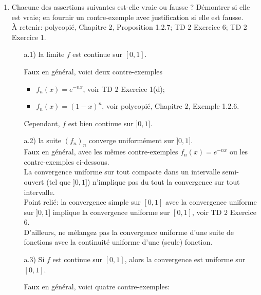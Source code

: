 \documentclass[a4paper,10pt]{article}
\newcommand{\correction}[1]{{\color{red}#1}}
\newcommand{\comment}[1]{{\color{blue}#1}}
\begin{document}
\begin{enumerate}[label=\alph*)]
    \item Chacune des assertions suivantes est-elle vraie ou fausse ? Démontrer si elle est vraie; en fournir un contre-exemple avec justification si elle est fausse.\\
    \comment{À retenir: polycopié, Chapitre 2, Proposition 1.2.7; TD 2 Exercice 6; TD 2 Exercice 1.}
    \begin{itemize}
        \item[a.1)] la limite $f$ est continue sur $[0,1]$.\\
        \correction{Faux en général, voici deux contre-exemples
        \begin{itemize}
            \item $f_n(x)=e^{-nx}$, voir TD 2 Exercice 1(d);
            \item $f_n(x)=(1-x)^n$, voir polycopié, Chapitre 2, Exemple 1.2.6.
        \end{itemize}
        }
        \comment{Cependant, $f$ est bien continue sur $]0,1]$.}
        \item[a.2)] la suite $(f_n)_n$ converge uniformément sur $]0,1]$.\\
        \correction{Faux en général, avec les mêmes contre-exemples $f_n(x)=e^{-nx}$ ou les contre-exemples ci-dessous.}\\
        \comment{La convergence uniforme sur tout compacte dans un intervalle semi-ouvert (tel que $]0,1]$) n'implique pas du tout la convergence sur tout intervalle.\\
        Point relié: la convergence simple sur $[0,1]$ avec la convergence uniforme sur $]0,1]$ implique la convergence uniforme sur $[0,1]$, voir TD 2 Exercice 6.\\
        D'ailleurs, ne mélangez pas la convergence uniforme d'une suite de fonctions avec la continuité uniforme d'une (seule) fonction.}
        \item[a.3)] Si $f$ est continue sur $[0,1]$, alors la convergence est uniforme sur $[0,1]$.\\
        \correction{Faux en général, voici quatre contre-exemples: 
        \begin{itemize}
            \item $f_n(x)=\left\{
                \begin{array}{cc}
                nx, & \text{si~} 0\leq x\leq \frac{1}{n}, \\

\end{array}
\end{itemize}}
\end{itemize}
\end{enumerate}
\end{document}

